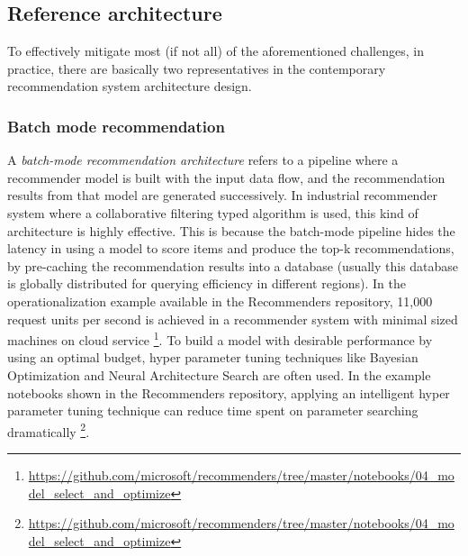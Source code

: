 \subsection{Reference architecture}

To effectively mitigate most (if not all) of the aforementioned challenges, in practice, there are basically two representatives in the contemporary recommendation system architecture design. 

\subsubsection{Batch mode recommendation}
A \textit{batch-mode recommendation architecture} refers to a pipeline where a recommender model is built with the input data flow, and the recommendation results from that model are generated successively. In industrial recommender system where a collaborative filtering typed algorithm is used, this kind of architecture is highly effective. This is because the batch-mode pipeline hides the latency in using a model to score items and produce the top-k recommendations, by pre-caching the recommendation results into a database (usually this database is globally distributed for querying efficiency in different regions). In the operationalization example available in the Recommenders repository, 11,000 request units per second is achieved in a recommender system with minimal sized machines on cloud service \footnote{\url{https://github.com/microsoft/recommenders/tree/master/notebooks/04_model_select_and_optimize}}. To build a model with desirable performance by using an optimal budget, hyper parameter tuning techniques like Bayesian Optimization \cite{snoek2012practical} and Neural Architecture Search \cite{zoph2016neural} are often used. In the example notebooks shown in the Recommenders repository, applying an intelligent hyper parameter tuning technique can reduce time spent on parameter searching dramatically \footnote{\url{https://github.com/microsoft/recommenders/tree/master/notebooks/04_model_select_and_optimize}}. 

